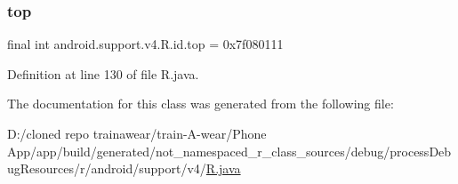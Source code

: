 \mbox{\label{classandroid_1_1support_1_1v4_1_1_r_1_1id_ac07fa206015ccb5a5bb0da6bbe642bc1}} 
\subsubsection{\texorpdfstring{top}{top}}
{\footnotesize\ttfamily final int android.\+support.\+v4.\+R.\+id.\+top = 0x7f080111\hspace{0.3cm}{\ttfamily [static]}}



Definition at line 130 of file R.\+java.



The documentation for this class was generated from the following file\+:\begin{DoxyCompactItemize}
\item 
D\+:/cloned repo trainawear/train-\/\+A-\/wear/\+Phone App/app/build/generated/not\+\_\+namespaced\+\_\+r\+\_\+class\+\_\+sources/debug/process\+Debug\+Resources/r/android/support/v4/\mbox{\hyperlink{process_debug_resources_2r_2android_2support_2v4_2_r_8java}{R.\+java}}\end{DoxyCompactItemize}

